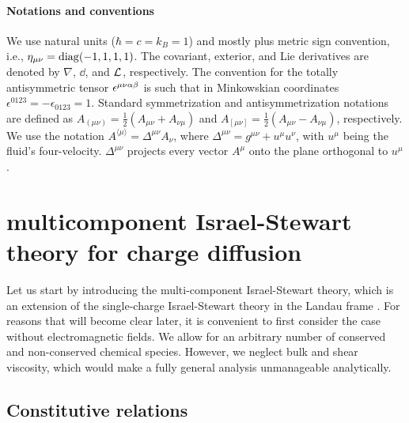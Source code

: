 \documentclass[
a4paper,
amsfonts,
amsmath,
reprint,
showkeys,
nofootinbib,
twoside,
onecolumn,
notitlepage
]{revtex4-1}
\begin{document}
	
	
	\paragraph*{Notations and conventions}
	We use natural units ($\hbar=c=k_B=1$) and mostly plus metric sign convention, i.e., $\eta_{\mu \nu} = \mathrm{diag}(-1,1,1,1)$. 
	The covariant, exterior, and Lie derivatives are denoted by $\nabla$, $\dd$, and ${\mathcal{L}}_{}{}$, respectively. 
	The convention for the totally antisymmetric tensor $\epsilon^{\mu\nu\alpha\beta}$ is such that in Minkowskian coordinates $\epsilon^{0123}=-\epsilon_{0123}=1$. 
	Standard symmetrization and antisymmetrization notations are defined as $A_{(\mu\nu)} = \tfrac{1}{2}\left(A_{\mu\nu} +A_{\nu\mu}\right)$ and
	$A_{[\mu\nu]} = \tfrac{1}{2}\left(A_{\mu\nu} -A_{\nu\mu}\right)$, respectively.
	We use the notation $A^{\langle\mu\rangle} = \Delta^{\mu\nu}A_\nu$, where $\Delta^{\mu\nu}=g^{\mu\nu}+u^\mu u^\nu$, with $u^\mu$ being the fluid's four-velocity.
	$\Delta^{\mu\nu}$ projects every vector $A^\mu$ onto the plane orthogonal to $u^\mu$. 
	\section{multicomponent Israel-Stewart theory for charge diffusion}
	\label{sec:multi-is}
	
	Let us start by introducing the multi-component Israel-Stewart theory, which is an extension of the single-charge Israel-Stewart theory in the Landau frame \cite{OlsonLifsh1990}. 
	For reasons that will become clear later, it is convenient to first consider the case without electromagnetic fields. 
	We allow for an arbitrary number of conserved and non-conserved chemical species. 
	However, we neglect bulk and shear viscosity, which would make a fully general analysis unmanageable analytically.
	
	\subsection{Constitutive relations}\label{sec:consti-rels}
	
\end{document}
